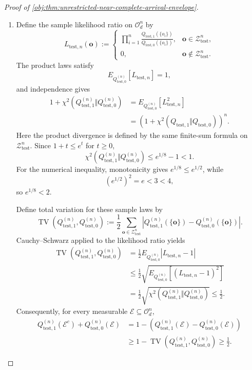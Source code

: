 \documentclass[11pt]{article}
\begin{document}
\begin{proof}[Proof of \cref{obj:thm:unrestricted-near-complete-arrival-envelope}]
\begin{enumerate}
\item Define the sample likelihood ratio on \(\mathcal O_d^n\) by
\[
L_{\mathrm{test},n}(\mathbf o)
:=
\begin{cases}
\displaystyle\prod_{i=1}^{n}
\frac{Q_{\mathrm{test},1}(\{o_i\})}
{Q_{\mathrm{test},0}(\{o_i\})},
&\mathbf o\in\mathcal Z_{\mathrm{test}}^n,\\
0,&\mathbf o\notin\mathcal Z_{\mathrm{test}}^n.
\end{cases}
\]
The product laws satisfy
\[
E_{Q_{\mathrm{test},0}^{(n)}}[L_{\mathrm{test},n}]=1,
\]
and independence gives
\[
\begin{aligned}
1+\chi^2(Q_{\mathrm{test},1}^{(n)}\Vert Q_{\mathrm{test},0}^{(n)})
&=
E_{Q_{\mathrm{test},0}^{(n)}}[L_{\mathrm{test},n}^2]\\
&=
\left(
1+\chi^2(Q_{\mathrm{test},1}\Vert Q_{\mathrm{test},0})
\right)^n.
\end{aligned}
\]
Here the product divergence is defined by the same finite-sum formula on
\(\mathcal Z_{\mathrm{test}}^n\). Since \(1+t\le e^t\) for \(t\ge0\),
\[
\chi^2(Q_{\mathrm{test},1}^{(n)}\Vert Q_{\mathrm{test},0}^{(n)})
\le e^{1/8}-1<1.
\]
For the numerical inequality, monotonicity gives \(e^{1/8}\le e^{1/2}\), while
\[
(e^{1/2})^2=e<3<4,
\]
so \(e^{1/8}<2\).

Define total variation for these sample laws by
\[
\operatorname{TV}(Q_{\mathrm{test},1}^{(n)},Q_{\mathrm{test},0}^{(n)})
:=
\frac12
\sum_{\mathbf o\in\mathcal Z_{\mathrm{test}}^n}
\left|
Q_{\mathrm{test},1}^{(n)}(\{\mathbf o\})
-
Q_{\mathrm{test},0}^{(n)}(\{\mathbf o\})
\right|.
\]
Cauchy--Schwarz applied to the likelihood ratio yields
\[
\begin{aligned}
\operatorname{TV}(Q_{\mathrm{test},1}^{(n)},Q_{\mathrm{test},0}^{(n)})
&=
\frac12E_{Q_{\mathrm{test},0}^{(n)}}|L_{\mathrm{test},n}-1|\\
&\le
\frac12\sqrt{
E_{Q_{\mathrm{test},0}^{(n)}}[(L_{\mathrm{test},n}-1)^2]
}\\
&=
\frac12\sqrt{
\chi^2(Q_{\mathrm{test},1}^{(n)}\Vert Q_{\mathrm{test},0}^{(n)})
}
\le\frac12.
\end{aligned}
\]
Consequently, for every measurable \(\mathcal E\subseteq\mathcal O_d^n\),
\[
\begin{aligned}
Q_{\mathrm{test},1}^{(n)}(\mathcal E^c)
+Q_{\mathrm{test},0}^{(n)}(\mathcal E)
&=
1-\left(
Q_{\mathrm{test},1}^{(n)}(\mathcal E)
-Q_{\mathrm{test},0}^{(n)}(\mathcal E)
\right)\\
&\ge
1-\operatorname{TV}(Q_{\mathrm{test},1}^{(n)},Q_{\mathrm{test},0}^{(n)})
\ge\frac12.
\end{aligned}
\]


\end{enumerate}
\end{proof}
\end{document}
